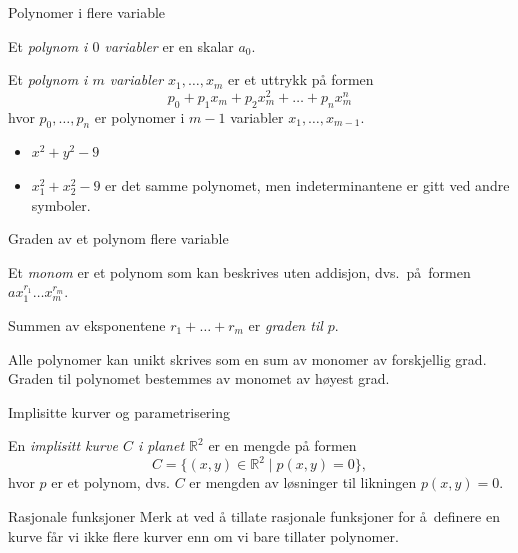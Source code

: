 \documentclass[norsk, handout]{beamer}
\theoremstyle{example}
\begin{document}
\begin{frame}{Polynomer i flere variable}
    \begin{definition}
        Et \textit{polynom i $0$ variabler} er en skalar $a_0$.

        Et \textit{polynom i $m$ variabler $x_1,\dots,x_m$} er et uttrykk på
        formen
        \[
            p_0 + p_1 x_m + p_2 x_m^2 + \dots + p_n x_m^n
        \]
        hvor $p_0,\dots, p_n$ er polynomer i $m - 1$ variabler
        $x_1,\dots, x_{m - 1}$.
    \end{definition}
    \begin{example}
        \begin{itemize}
            \item $x^2 + y^2 - 9$
            \item $x_1^2 + x_2^2 - 9$ er det samme polynomet,
                men indeterminantene er gitt ved andre symboler.
        \end{itemize}
    \end{example}
\end{frame}

\begin{frame}{Graden av et polynom flere variable}
    \begin{definition}
        Et \textit{monom} er et polynom som kan beskrives uten addisjon,
        dvs.\ på formen $a x_1^{r_1}\dots x_m^{r_m}$.

        Summen av eksponentene $r_1 + \dots + r_m$ er \textit{graden til $p$}.
    \end{definition}
    Alle polynomer kan unikt skrives som en sum av monomer av forskjellig grad.
    Graden til polynomet bestemmes av monomet av høyest grad.
\end{frame}

\begin{frame}{Implisitte kurver og parametrisering}
    \begin{definition}
        En \textit{implisitt kurve $C$ i planet $\mathbb R^2$}
        er en mengde på formen
        \[
            C = \{ (x,y)\in \mathbb R^2 \mid p(x,y) = 0\},
        \]
        hvor $p$ er et polynom,
        dvs. $C$ er mengden av løsninger til likningen $p(x,y) = 0$.
    \end{definition}
\end{frame}

\begin{frame}{Rasjonale funksjoner}
    Merk at ved å tillate rasjonale funksjoner for å definere en kurve
    får vi ikke flere kurver enn om vi bare tillater polynomer.
\end{frame}
\end{document}
